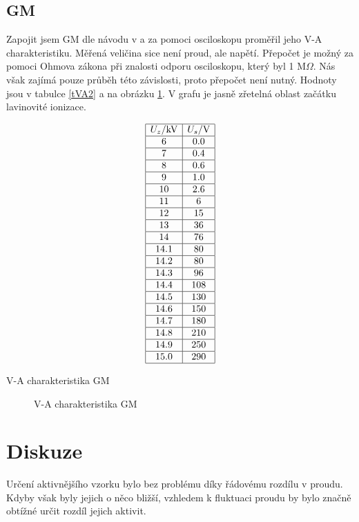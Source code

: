 \documentclass[a4paper,12pt]{article}
\begin{document}
\subsection{GM}
Zapojit jsem GM dle návodu v \cite{text} a za pomoci osciloskopu proměřil 
jeho V-A charakteristiku. Měřená veličina sice není proud, ale napětí. 
Přepočet je možný za pomoci Ohmova zákona při znalosti odporu osciloskopu, 
který byl 1 M$\Omega$. Nás však zajímá pouze průběh této závislosti, proto přepočet není nutný. Hodnoty jsou v tabulce \ref{tVA2} a na obrázku \ref{gVA2}.
V grafu je jasně zřetelná oblast začátku lavinovité ionizace.
\begin{table}
$$
\begin{array}{|c|c|}
\hline
U_z/\mbox{kV}&    U_s/\mbox{V} \\ \hline
6&  0.0 \\ \hline
7&  0.4 \\ \hline
8&  0.6 \\ \hline
9&  1.0 \\ \hline
10& 2.6 \\ \hline
11& 6 \\ \hline
12& 15 \\ \hline
13& 36 \\ \hline
14& 76 \\ \hline
14.1& 80 \\ \hline
14.2&   80 \\ \hline
14.3&   96 \\ \hline
14.4&   108 \\ \hline
14.5&   130 \\ \hline
14.6&   150 \\ \hline
14.7&   180 \\ \hline
14.8&   210 \\ \hline
14.9&   250 \\ \hline
15.0&   290 \\ \hline
\end{array}
$$
\caption{V-A charakteristika GM}
\label{tVA2}
\end{table}

\begin{figure}
\begin{center}

\end{center}
\caption{V-A charakteristika GM}
\label{gVA2}
\end{figure}


\section{Diskuze}
Určení aktivnějšího vzorku bylo bez problému díky řádovému rozdílu v proudu. Kdyby však byly jejich o něco bližší, vzhledem k fluktuaci proudu by bylo značně obtížné určit rozdíl jejich aktivit.
\end{document}
